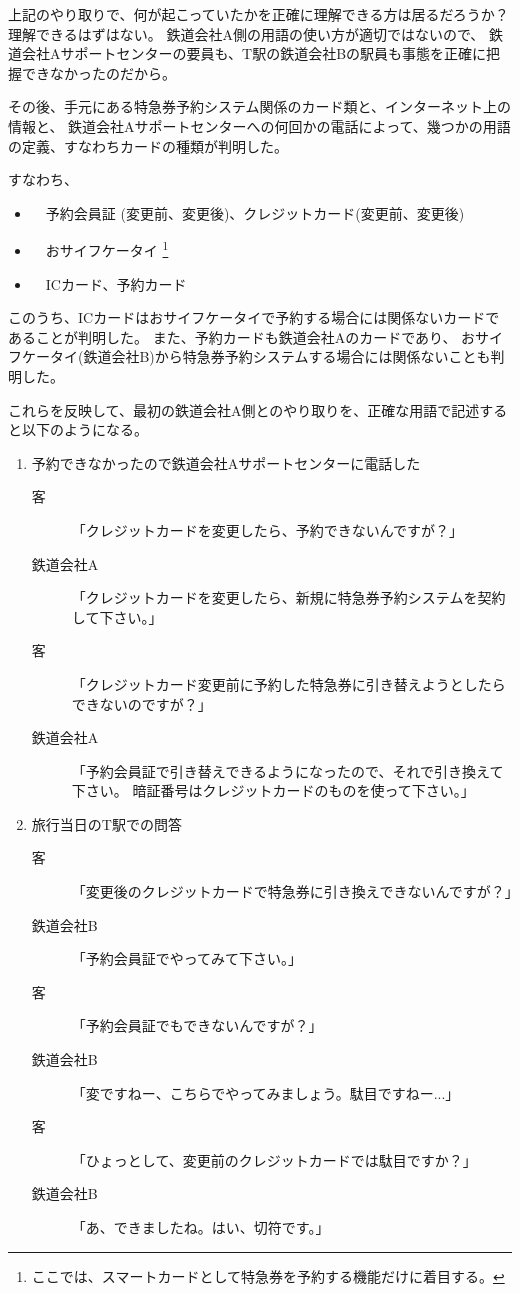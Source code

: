 	上記のやり取りで、何が起こっていたかを正確に理解できる方は居るだろうか？
	理解できるはずはない。
	鉄道会社A側の用語の使い方が適切ではないので、
	鉄道会社Aサポートセンターの要員も、T駅の鉄道会社Bの駅員も事態を正確に把握できなかったのだから。

その後、手元にある特急券予約システム関係のカード類と、インターネット上の情報と、
鉄道会社Aサポートセンターへの何回かの電話によって、幾つかの用語の定義、すなわちカードの種類が判明した。

すなわち、

\begin{itemize}
	\item　予約会員証 (変更前、変更後)、クレジットカード(変更前、変更後)
	\item　おサイフケータイ
		\footnote{ここでは、スマートカードとして特急券を予約する機能だけに着目する。}
	\item　ICカード、予約カード
\end{itemize} 

このうち、ICカードはおサイフケータイで予約する場合には関係ないカードであることが判明した。
また、予約カードも鉄道会社Aのカードであり、
おサイフケータイ(鉄道会社B)から特急券予約システムする場合には関係ないことも判明した。

これらを反映して、最初の鉄道会社A側とのやり取りを、正確な用語で記述すると以下のようになる。

\begin{enumerate}
\item 予約できなかったので鉄道会社Aサポートセンターに電話した

	\begin{description}
	\item [客]「クレジットカードを変更したら、予約できないんですが？」
	\item [鉄道会社A]「クレジットカードを変更したら、新規に特急券予約システムを契約して下さい。」
	\item [客]「クレジットカード変更前に予約した特急券に引き替えようとしたらできないのですが？」
	\item [鉄道会社A]「予約会員証で引き替えできるようになったので、それで引き換えて下さい。
			暗証番号はクレジットカードのものを使って下さい。」
	\end{description}

\item 旅行当日のT駅での問答

	\begin{description}
	\item [客]「変更後のクレジットカードで特急券に引き換えできないんですが？」
	\item [鉄道会社B]「予約会員証でやってみて下さい。」
	\item [客]「予約会員証でもできないんですが？」
	\item [鉄道会社B]「変ですねー、こちらでやってみましょう。駄目ですねー...」
	\item [客]「ひょっとして、変更前のクレジットカードでは駄目ですか？」
	\item [鉄道会社B]「あ、できましたね。はい、切符です。」
	\end{description}
\end{enumerate}

